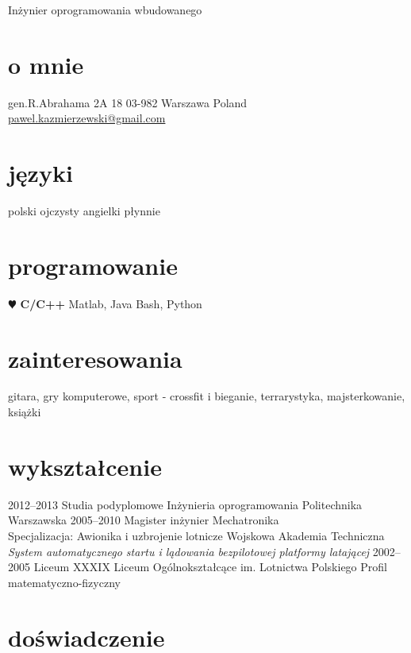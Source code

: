 \documentclass[]{friggeri-cv}
\begin{document}
       {Inżynier oprogramowania wbudowanego}


\begin{aside}
  \section{o mnie}
    gen.R.Abrahama 2A 18
    03-982 Warszawa
    Poland
    ~
    \href{mailto:pawel.kazmierzewski@gmail.com}{pawel.kazmierzewski@gmail.com}
  \section{języki}
    polski  ojczysty
    angielki płynnie
  \section{programowanie}
  {\color{red} $\varheartsuit$} {\bf C/C++}
    Matlab, Java
    Bash, Python
\end{aside}

\section{zainteresowania}

gitara, gry komputerowe, sport - crossfit i bieganie, terrarystyka, majsterkowanie, książki 

\section{wykształcenie}

\begin{entrylist}
  \entry
  {2012–2013}
  {Studia podyplomowe {\normalfont Inżynieria oprogramowania}}
  {Politechnika Warszawska}
  {}
  \entry
  {2005–2010}
  {Magister inżynier
    {\normalfont Mechatronika\\
    Specjalizacja: Awionika i uzbrojenie lotnicze}}
  {Wojskowa Akademia Techniczna}
  {\emph{System automatycznego startu i lądowania bezpilotowej platformy latającej}}
  \entry
    {2002–2005}
    {Liceum}
    {XXXIX Liceum Ogólnokształcące im. Lotnictwa Polskiego}
    {Profil matematyczno-fizyczny}
\end{entrylist}

\section{doświadczenie}
\end{document}

